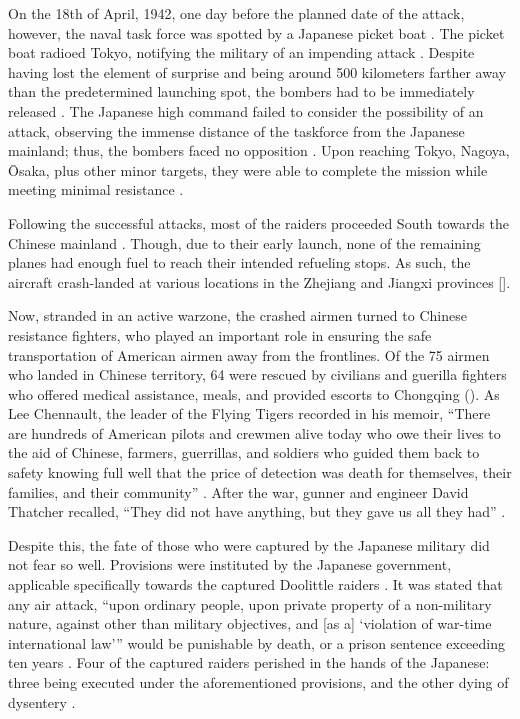 On the 18th of April, 1942, one day before the planned date of the attack, however, the naval task force was spotted by a Japanese picket boat \autocite[p.\ 442]{CravenCate1948AAFWW2Vol1}. The picket boat radioed Tokyo, notifying the military of an impending attack \autocite[p.\ 45]{Chun2006DoolittleRaid}. Despite having lost the element of surprise and being around 500 kilometers farther away than the predetermined launching spot, the bombers had to be immediately released \autocite{Correll2009DoolittlesRaid}. The Japanese high command failed to consider the possibility of an attack, observing the immense distance of the taskforce from the Japanese mainland; thus, the bombers faced no opposition \autocite[p.\ 441]{CravenCate1948AAFWW2Vol1}. Upon reaching Tokyo, Nagoya, Ōsaka, plus other minor targets, they were able to complete the mission while meeting minimal resistance \autocite{ArmyAirForces1942DoolittleReport}.

Following the successful attacks, most of the raiders proceeded South towards the Chinese mainland \autocite{Britannica2024DoolittleRaid}. Though, due to their early launch, none of the remaining planes had enough fuel to reach their intended refueling stops. As such, the aircraft crash-landed at various locations in the Zhejiang and Jiangxi provinces [\cites{Britannica2024DoolittleRaid}{Doolittle1942GeneralReportJapaneseRaid}].

Now, stranded in an active warzone, the crashed airmen turned to Chinese resistance fighters, who played an important role in ensuring the safe transportation of American airmen away from the frontlines. Of the 75 airmen who landed in Chinese territory, 64 were rescued by civilians and guerilla fighters who offered medical assistance, meals, and provided escorts to Chongqing (\cites{Leng2023DoolittleFriendshipGlobalTimes}{Walsh1992WPMeetAgain}). As Lee Chennault, the leader of the Flying Tigers recorded in his memoir, “There are hundreds of American pilots and crewmen alive today who owe their lives to the aid of Chinese, farmers, guerrillas, and soldiers who guided them back to safety knowing full well that the price of detection was death for themselves, their families, and their community” \autocite[p.\ 169]{Hotz1949WayOfAFighter}. After the war, gunner and engineer David Thatcher recalled, “They did not have anything, but they gave us all they had” \autocite{Zhuang2018AfterTheAirRaidSCMP}.

Despite this, the fate of those who were captured by the Japanese military did not fear so well. Provisions were instituted by the Japanese government, applicable specifically towards the captured Doolittle raiders \autocite[p.\ 70]{Liverpool2008KnightsOfBushido}. It was stated that any air attack, “upon ordinary people, upon private property of a non-military nature, against other than military objectives, and [as a] ‘violation of war-time international law’” would be punishable by death, or a prison sentence exceeding ten years \autocite[pp.\ 70--71]{Liverpool2008KnightsOfBushido}. Four of the captured raiders perished in the hands of the Japanese: three being executed under the aforementioned provisions, and the other dying of dysentery \autocite{Britannica2024DoolittleRaid}. 

